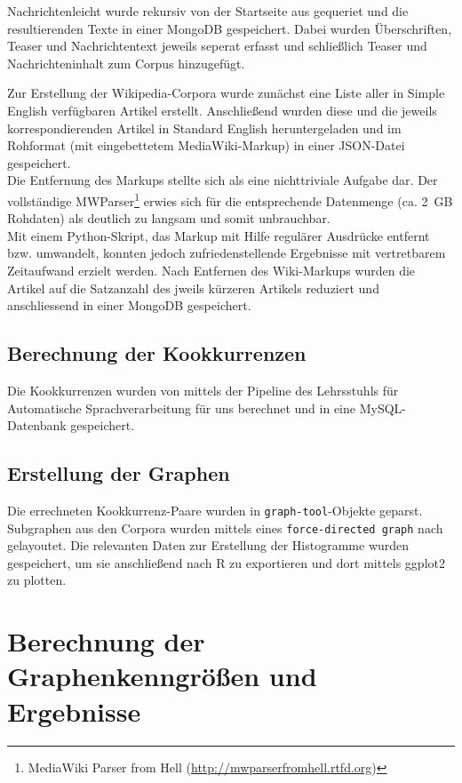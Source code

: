 \documentclass[11pt, a4paper]{article}
\begin{document}
Nachrichtenleicht wurde rekursiv von der Startseite aus gequeriet
und die resultierenden Texte in einer MongoDB gespeichert.
Dabei wurden Überschriften, Teaser und Nachrichtentext jeweils seperat erfasst
und schließlich Teaser und Nachrichteninhalt zum Corpus hinzugefügt.

Zur Erstellung der Wikipedia-Corpora wurde zunächst eine Liste aller
in Simple English verfügbaren Artikel erstellt. Anschließend wurden diese und
die jeweils korrespondierenden Artikel in Standard English heruntergeladen und
im Rohformat (mit eingebettetem MediaWiki-Markup) in einer JSON-Datei gespeichert.
\\
Die Entfernung des Markups stellte sich als eine nichttriviale Aufgabe dar.
Der vollständige MWParser\footnote{MediaWiki
Parser from Hell (\url{http://mwparserfromhell.rtfd.org})} erwies sich für die
entsprechende Datenmenge (ca. 2~GB Rohdaten) als deutlich zu langsam
und somit unbrauchbar.
\\
Mit einem Python-Skript, das Markup mit Hilfe regul\"arer Ausdr\"ucke entfernt
bzw. umwandelt, konnten jedoch zufriedenstellende Ergebnisse mit vertretbarem
Zeitaufwand erzielt werden.
Nach Entfernen des Wiki-Markups wurden die Artikel auf die Satzanzahl
des jweils k\"urzeren Artikels reduziert und anschliessend in einer MongoDB
gespeichert.


\subsection{Berechnung der Kookkurrenzen}

Die Kookkurrenzen wurden von mittels der Pipeline des Lehrsstuhls f\"ur
Automatische Sprachverarbeitung für uns berechnet und in eine MySQL-Datenbank
gespeichert.


\subsection{Erstellung der Graphen}

Die errechneten Kookkurrenz-Paare wurden in \texttt{graph-tool}-Objekte geparst.
Subgraphen
aus den Corpora wurden mittels eines \texttt{force-directed graph} nach
\cite{Hu2006} gelayoutet.
Die relevanten Daten zur Erstellung der Histogramme wurden gespeichert,
um sie anschließend nach R zu exportieren und dort mittels ggplot2 zu plotten.


\section{Berechnung der Graphenkenngr\"o\ss{}en und Ergebnisse}
\end{document}
